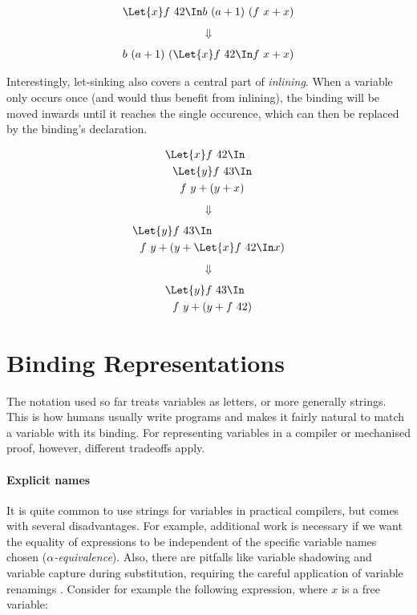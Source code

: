     \begin{align*}
      \Let{x} f\ 42 \In b\ (a + 1)\ (f\ x + x)
    \end{align*}
    \begin{align*}
      \Downarrow
    \end{align*}
    \begin{align*}
      b\ (a + 1)\ (\Let{x} f\ 42 \In f\ x + x)
    \end{align*}

    Interestingly, let-sinking also covers a central part of \emph{inlining}.
    When a variable only occurs once (and would thus benefit from inlining),
    the binding will be moved inwards until it reaches the single occurence,
    which can then be replaced by the binding's declaration.

    \begin{align*}
      &\Let{x} f\ 42 \In          \\
      &\ \ \Let{y} f\ 43 \In      \\
      &\ \ \ \ f\ y + (y + x)
    \end{align*}
    \begin{align*}
      \Downarrow
    \end{align*}
    \begin{align*}
      &\Let{y} f\ 43 \In      \\
      &\ \ f\ y + (y + \Let{x} f\ 42 \In x)
    \end{align*}
    \begin{align*}
      \Downarrow
    \end{align*}
    \begin{align*}
      &\Let{y} f\ 43 \In      \\
      &\ \ f\ y + (y + f\ 42)
    \end{align*}

\section{Binding Representations}
\label{sec:binding-representations}
    The notation used so far treats variables as letters, or more generally strings.
    This is how humans usually write programs
    and makes it fairly natural to match a variable with its binding.
    For representing variables in a compiler or mechanised proof, however,
    different tradeoffs apply.
  \paragraph{Explicit names}
    It is quite common to use strings for variables in practical compilers,
    but comes with several disadvantages.
    For example, additional work is necessary
    if we want the equality of expressions to be independent of the specific variable names chosen
    (\emph{$\alpha$-equivalence}).
    Also, there are pitfalls like variable shadowing and variable capture during substitution,
    requiring the careful application of variable renamings
    \cite{Barendregt1985LambdaCalculus}.
    Consider for example the following expression, where $x$ is a free variable:


